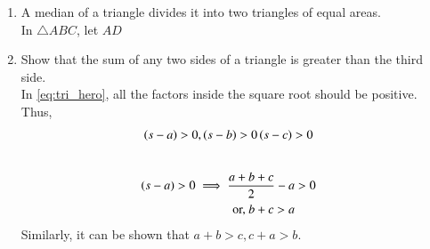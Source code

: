 \begin{enumerate}[label=\arabic*.,ref=\thesubsection.\theenumi]
%
\item A median of a triangle divides it into two triangles of equal areas.
\\
\solution In $\triangle ABC$, let $AD$
%
\item Show that the sum of any two sides of a triangle is greater than the third side.
\\
\solution In \eqref{eq:tri_hero}, all the factors inside the square root should be positive.  Thus, 
%
\begin{align}
\left(s-a\right) > 0, \left(s-b\right) > 0\left(s-c\right) &> 0
\end{align}
%
\begin{align}
\\
\left(s-a\right) > 0 \implies \frac{a+b+c}{2} -a &> 0
\\
\text{or, } b+c > a
\end{align}
%
Similarly, it can be shown that $a+b>c, c+a>b$.


\end{enumerate}
